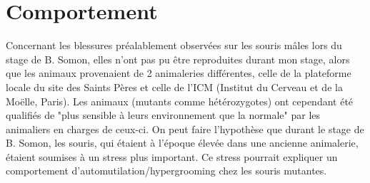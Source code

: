 \section{Comportement}
\label{sec:Comportement}
Concernant les blessures préalablement observées sur les souris \mcrd mâles lors du stage de B. Somon, elles n'ont pas pu être reproduites durant mon stage, alors que les animaux provenaient de 2 animaleries différentes, celle de la plateforme locale du site des Saints Pères et celle de l’ICM (Institut du Cerveau et de la Moëlle, Paris). Les animaux (mutants comme hétérozygotes) ont cependant été qualifiés de "plus sensible à leurs environnement que la normale" par les animaliers en charges de ceux-ci. On peut faire l'hypothèse que durant le stage de B. Somon, les souris, qui étaient à l'époque élevée dans une ancienne animalerie, étaient soumises à un stress plus important. Ce stress pourrait expliquer un comportement d'automutilation/hypergrooming chez les souris mutantes. 